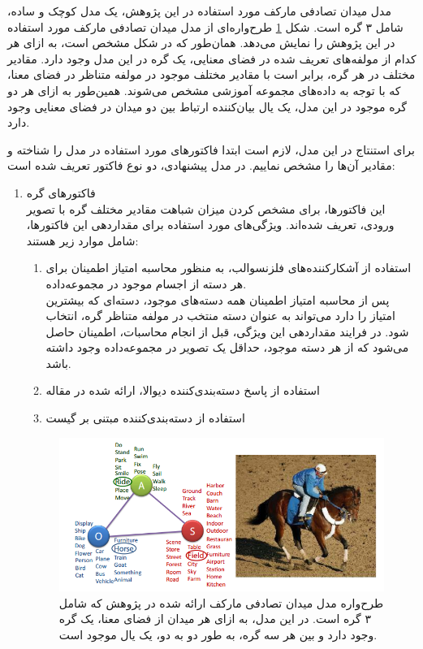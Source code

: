 مدل میدان تصادفی مارکف مورد استفاده در این پژوهش، یک مدل کوچک و ساده، شامل ۳ گره است. شکل \ref{fig:F2010EF2}
طرح‌واره‌ای از مدل میدان تصادفی مارکف مورد استفاده در این پژوهش را نمایش می‌دهد. همان‌طور که در شکل مشخص است،  به ازای هر کدام از مولفه‌های تعریف شده در فضای معنایی، یک گره در این مدل وجود دارد. مقادیر مختلف در هر گره، برابر است با مقادیر مختلف موجود در مولفه متناظر در فضای معنا، که با توجه به داده‌های مجموعه‌‌ ‌آموزشی مشخص می‌شوند. همین‌طور به ازای هر دو گره موجود در این مدل، یک یال بیان‌کننده ارتباط بین دو میدان در فضای معنایی وجود دارد.

برای استنتاج در این مدل، لازم است ابتدا فاکتور‌های مورد استفاده در مدل را شناخته و مقادیر آن‌ها را مشخص نماییم. در مدل پیشنهادی، دو نوع فاکتور تعریف شده است:

\begin{enumerate}
	\item فاکتورهای گره\\
	این فاکتورها، برای مشخص کردن میزان شباهت مقادیر مختلف گره با تصویر ورودی، تعریف شده‌‌اند. ویژگی‌‌های مورد استفاده برای مقداردهی این فاکتورها، شامل موارد زیر هستند:
	\begin{enumerate}
		\item	 استفاده از آشکارکننده‌های
		فلزنسوالب، 
		به منظور محاسبه امتیاز اطمینان برای هر دسته از اجسام موجود در مجموعه‌داده\cite{felzenszwalb2008discriminatively}.\\
		پس از محاسبه امتیاز اطمینان همه دسته‌های موجود، دسته‌ای که بیشترین امتیاز را دارد می‌تواند به عنوان دسته‌ منتخب در مولفه متناظر گره، انتخاب شود. در فرایند مقداردهی این ویژگی، قبل از انجام محاسبات، اطمینان حاصل می‌شود که از هر دسته موجود، حداقل یک تصویر در مجموعه‌داده وجود داشته باشد.
		\item استفاده از پاسخ دسته‌بندی‌کننده دیوالا، ارائه شده در مقاله\cite{divvala2009empirical}
		\item استفاده از دسته‌بندی‌کننده مبتنی بر گیست
	\end{enumerate}
	
	\begin{figure}[h]
		\center
		\includegraphics[scale=0.6]{./Imgs/farhadi2010every_fig2.png}
		\caption[مدل میدان تصادفی مارکف در درک صحنه]{
			طرح‌واره مدل میدان تصادفی مارکف ارائه شده در پژوهش \cite{Farhadi2010every} که شامل ۳ گره است. در این مدل، به ازای هر میدان از فضای معنا، یک گره وجود دارد و بین هر سه گره‌، به طور دو به دو، یک یال موجود است\cite{Farhadi2010every}.
		}
		\label{fig:F2010EF2}
	\end{figure}
	

\end{enumerate}
